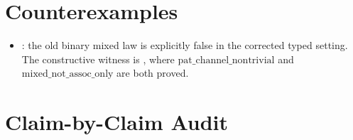 \documentclass[11pt,openany]{report}
\begin{document}
\section{Counterexamples}

\begin{itemize}
\item {}:
  the old binary mixed law is explicitly false in the corrected typed
  setting.  The constructive witness is
  , where
  $\mathrm{pat\_channel\_nontrivial}$ and
  $\mathrm{mixed\_not\_assoc\_only}$ are both proved.
\end{itemize}

\section{Claim-by-Claim Audit}
\end{document}
